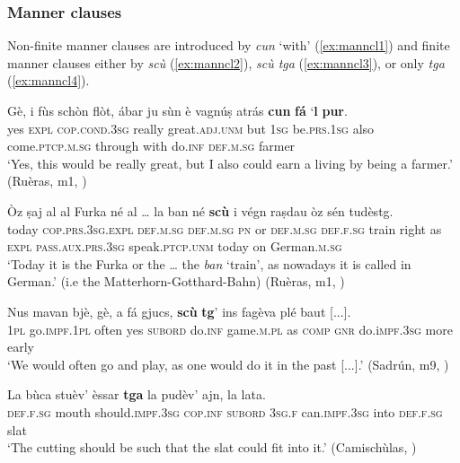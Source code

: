 \subsubsection{Manner clauses}\label{sec:6.2.2.2}
Non-finite manner clauses are introduced by \textit{cun} `with' (\ref{ex:manncl1}) and finite manner clauses either by \textit{scù} (\ref{ex:manncl2}), \textit{scù tga} (\ref{ex:manncl3}), or only \textit{tga} (\ref{ex:manncl4}).

\ea
\label{ex:manncl1}
\gll   Gè, i fùs schòn flòt, ábar ju sùn è vagnúṣ atrás \textbf{cun} \textbf{fá} `\textbf{l} \textbf{pur}. \\
yes \textsc{expl} \textsc{cop.cond.3sg} really great.\textsc{adj.unm} but \textsc{1sg}  be.\textsc{prs.1sg} also  come.\textsc{ptcp.m.sg} through with  do.\textsc{inf} \textsc{def.m.sg} farmer\\
\glt `Yes, this would be really great, but I also could earn a living by being a farmer.' (Ruèras, m1, )
\z

\ea
\label{ex:manncl2}
\gll    Òz ṣaj al al Furka né al … la ban\footnotemark{} né \textbf{scù} i végn raṣdau òz sén tudèstg.\\
today \textsc{cop.prs.3sg.expl} \textsc{def.m.sg} \textsc{def.m.sg} \textsc{pn} or \textsc{def.m.sg} {} \textsc{def.f.sg} train right as \textsc{expl} \textsc{pass.aux.prs.3sg} speak.\textsc{ptcp.unm} today on German.\textsc{m.sg}\\
\glt `Today it is the Furka or the … the \textit{ban} `train', as nowadays it is called in German.' (i.e the Matterhorn-Gotthard-Bahn) (Ruèras, m1, )
\z

\ea
\label{ex:manncl3}
\gll Nus mavan bjè, gè, a fá gjucs, \textbf{scù} \textbf{tg}’ ins fagèva plé baut [...].   \\
\textsc{1pl} go.\textsc{impf.1pl} often yes \textsc{subord} do.\textsc{inf} game.\textsc{m.pl} as \textsc{comp} \textsc{gnr} do.i\textsc{mpf.3sg} more early\\
\glt `We would often go and play, as one would do it in the past [...].' (Sadrún, m9, )
\z

\ea
\label{ex:manncl4}
\gll   La bùca stuèv' èssar \textbf{tga} la pudèv' ajn, la lata.\\
\textsc{def.f.sg} mouth should.\textsc{impf.3sg} \textsc{cop.inf} \textsc{subord} \textsc{3sg.f} can.\textsc{impf.3sg} into \textsc{def.f.sg} slat\\
\glt `The cutting should be such that the slat could fit into it.' (Camischùlas, )
\z

